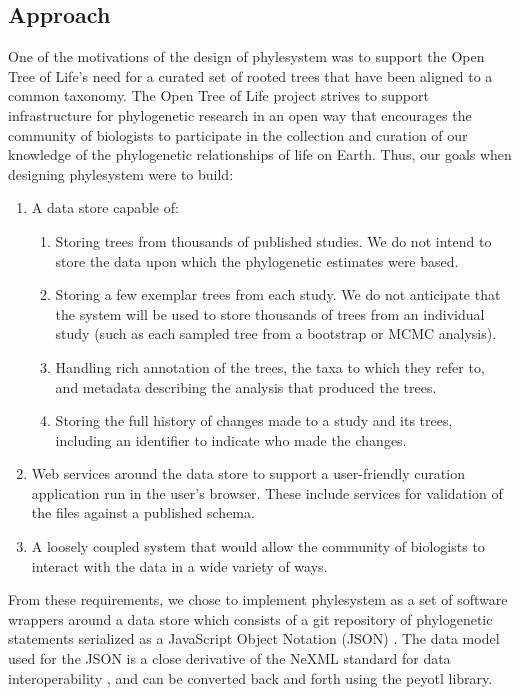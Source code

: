 \documentclass{bioinfo}
\newcommand{\ps}{phylesystem\xspace}
\newcommand{\otol}{Open Tree of Life\xspace}
\newcommand{\js}{JavaScript\xspace}
\begin{document}
\subsection{Approach}
One of the motivations of the design of \ps was to support the \otol's need for a curated set
    of rooted trees that have been aligned to a common taxonomy.
The \otol project strives to support infrastructure for phylogenetic
    research in an open way that encourages the community of biologists to participate in the 
    collection and curation of our knowledge of the phylogenetic relationships of life on Earth.
Thus, our goals when designing \ps were to build: 
\begin{enumerate}
    \item  A data store capable of:
        \begin{enumerate}
            \item \label{fewKStudies} Storing trees from thousands of published studies. We do not intend to store the 
                data upon which the phylogenetic estimates were based.
            \item \label{fewTreesPerStudy} Storing a few exemplar trees from each study. We do not anticipate that the system will be used 
                to store thousands of trees from 
                an individual study (such as each sampled tree from a bootstrap or MCMC analysis).
            \item \label{richAnnot} Handling rich annotation of the trees, the taxa to which they refer to, and metadata describing 
                the analysis that produced the trees.
            \item \label{history} Storing the full history of changes made to a study and its trees,
                including an identifier to indicate who made the changes.
        \end{enumerate}
    \item \label{ws} Web services around the data store to support a user-friendly curation application run in the user's browser. These include services for validation of the files against a published schema.
    \item \label{looseOpen} A loosely coupled system that would allow the community of biologists to interact with the data in a wide variety of ways.
\end{enumerate}
From these requirements, we chose to implement \ps as a set of software wrappers around a data store
    which consists of a git \citep{git} repository of phylogenetic statements serialized as a \js Object Notation (JSON) \citep{Crockford2006}.
The data model used for the JSON is a close derivative of the NeXML standard for data interoperability \citep{NeXML},
  and can be converted back and forth using the peyotl library.
\end{document}
